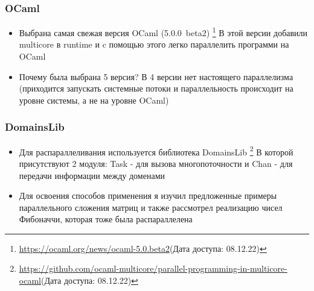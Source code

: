 \documentclass{beamer}
\begin{document}

\begin{frame}
  \frametitle{OCaml}
  \begin{itemize}
  \item Выбрана самая свежая версия OCaml (5.0.0~beta2)
  \footnote{\url{https://ocaml.org/news/ocaml-5.0.beta2}(Дата доступа: 08.12.22)}
  В этой версии добавили multicore в runtime и
  c помощью этого легко параллелить программи на OCaml
  \item Почему была выбрана 5 версия? В 4 версии нет настоящего параллелизма (приходится запускать системные потоки и параллельность происходит на уровне системы, а не на уровне OCaml)
  \end{itemize}
\end{frame}



  
\begin{frame}
  \frametitle{DomainsLib}
  \begin{itemize}
  \item Для распараллеливания используется библиотека DomainsLib
  \footnote{\url{https://github.com/ocaml-multicore/parallel-programming-in-multicore-ocaml}(Дата доступа: 08.12.22)} 
  В которой присутствуют 2 модуля: Task - для вызова многопоточности и Chan - для передачи информации между доменами
  \item Для освоения способов применения я изучил предложенные примеры параллельного сложения матриц и также рассмотрел реализацию чисел Фибоначчи, которая тоже была распараллелена
  \end{itemize}
\end{frame}
\end{document}
